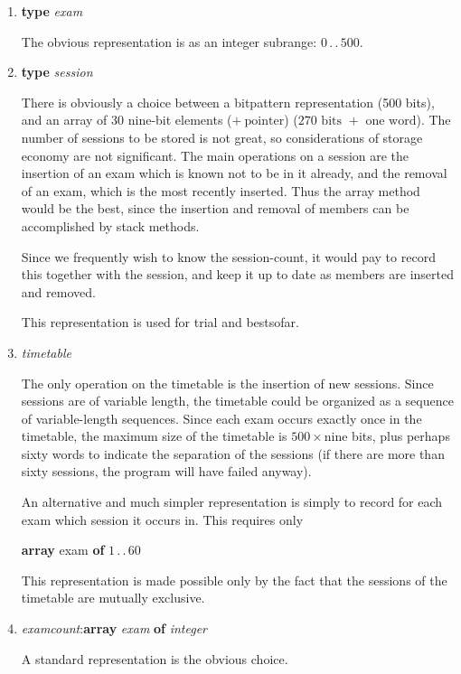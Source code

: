 \documentclass[twoside,11pt]{book}
\begin{document}
\begin{enumerate}[wide, nosep, label=(\arabic*)]
	\item \textbf{type} \textit{exam}

	\noindent
	The obvious representation is as an integer subrange: $0\,.\,.\,500$.

	\item \textbf{type} \textit{session}

	\noindent
	There is obviously a choice between a bitpattern representation (500 bits), and an array of 30 nine-bit elements ($+\ \text{pointer}$) ($270 \text{ bits } + \text{ one word}$). The number of sessions to be stored is not great, so considerations of storage  economy are not significant. The main operations on a session are the insertion of an exam which is known not to be in it already, and the removal of an exam, which is the most recently inserted. Thus the array method would be the best, since the insertion and removal of members can be accomplished by stack methods.

	Since we frequently wish to know the session-count, it would pay to record this together with the session, and keep it up to date as members are inserted and removed.

	This representation is used for trial and bestsofar.

	\item \textit{timetable}

	\noindent
	The only operation on the timetable is the insertion of new sessions. Since sessions are of variable length, the timetable could be organized as a sequence of variable-length sequences. Since each exam occurs exactly once in the timetable, the maximum size of the timetable is $500 \times \text{nine}$ bits, plus perhaps sixty words to indicate the separation of the sessions (if there are more than sixty sessions, the program will have failed anyway).

	An alternative and much simpler representation is simply to record for each exam which session it occurs in. This requires only

	\quad \textbf{array} exam \textbf{of} $1\,.\,.\,60$

	\noindent
	This representation is made possible only by the fact that the sessions of the timetable are mutually exclusive.

	\item \textit{examcount}:\textbf{array} \textit{exam} \textbf{of} \textit{integer}

	\noindent
	A standard representation is the obvious choice.


\end{enumerate}
\end{document}
